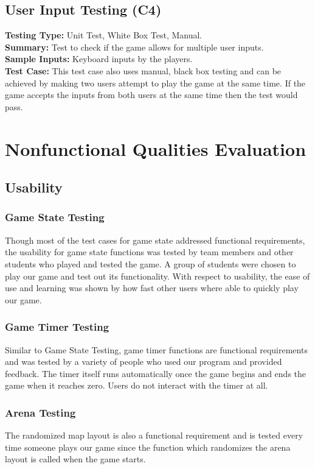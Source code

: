 \documentclass[12pt, letterpaper]{article}
\begin{document}
\subsection{User Input Testing (C4)}
\textbf{Testing Type:} Unit Test, White Box Test, Manual.\\
\noindent \textbf{Summary:} Test to check if the game allows for multiple user inputs.\\
\noindent \textbf{Sample Inputs:} Keyboard inputs by the players.\\
\noindent \textbf{Test Case:} This test case also uses manual, black box testing and can be achieved by making two users attempt to play the game at the same time. If the game accepts the inputs from both users at the same time then the test would pass.

\section{Nonfunctional Qualities Evaluation} %
\subsection{Usability}
\subsubsection{Game State Testing}
\indent \indent Though most of the test cases for game state addressed functional requirements, the usability for game state functions was tested by team members and other students who played and tested the game. A group of students were chosen to play our game and test out its functionality. With respect to usability, the ease of use and learning was shown by how fast other users where able to quickly play our game.
\subsubsection{Game Timer Testing}
\indent \indent Similar to Game State Testing, game timer functions are functional requirements and was tested by a variety of people who used our program and provided feedback. The timer itself runs automatically once the game begins and ends the game when it reaches zero. Users do not interact with the timer at all.
\subsubsection{Arena Testing}
\indent \indent The randomized map layout is also a functional requirement and is tested every time someone plays our game since the function which randomizes the arena layout is called when the game starts.
\end{document}
